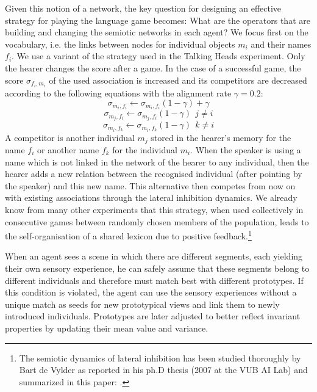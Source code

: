 Given this notion of a network, the key question for designing an effective 
strategy for playing the language game becomes: What are the operators that are building and
changing the semiotic networks in each agent? We focus first on the
vocabulary, i.e. the links between nodes for individual objects $m_i$ and their 
names $f_i$. We use a variant of the strategy used in the Talking Heads experiment. 
Only the hearer changes the score after a game. 
In the case of a successful game, the score $\sigma_{f_i,m_i}$ of the used association is 
increased and its competitors are decreased according to the following
equations with the alignment rate $\gamma = 0.2$: 
\begin{equation}
 \sigma_{m_i,f_i} \leftarrow \sigma_{m_i,f_i} (1-\gamma) + \gamma
\end{equation}
\begin{equation}
 \sigma_{m_j,f_i} \leftarrow \sigma_{m_j,f_i} (1-\gamma) ~~j \neq i
\end{equation}
\begin{equation}
 \sigma_{m_i,f_k} \leftarrow \sigma_{m_i,f_k} (1-\gamma) ~~k \neq i
\end{equation}
A competitor is another individual $m_j$ stored in the hearer's memory 
for the name $f_i$ or another name $f_k$ for the individual 
$m_i$. When the speaker is using a name which is not linked in the network 
of the hearer to any individual, then the hearer adds a new relation between 
the recognised individual (after pointing by the speaker) and this new name. 
This alternative then competes from 
now on with existing associations through the lateral inhibition dynamics. 
We already know from many other experiments that this strategy, when used collectively in 
consecutive games between randomly chosen members of the population, leads to the  
self-organisation of a shared lexicon due to positive feedback.\footnote{
The semiotic dynamics of lateral inhibition has been studied thoroughly by Bart de Vylder as reported in his ph.D thesis 
(2007 at the VUB AI Lab) and summarized in this paper: \cite{deVylder:2006}.}
 
When an agent sees a scene in which there are different segments, each yielding their own sensory
experience, he can safely assume that these segments belong to 
different individuals and therefore must match best with 
different prototypes. If this condition is violated, the agent
can use the sensory experiences without a unique match as seeds for new
prototypical views and link them to newly introduced individuals.  
Prototypes are later adjusted to better reflect invariant properties by updating their 
mean value and variance. 


